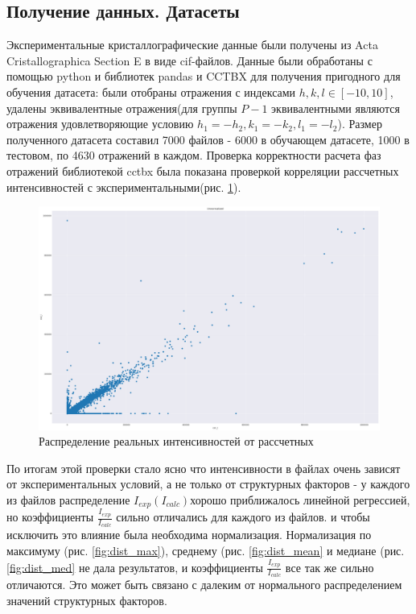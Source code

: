 \documentclass{article}
\begin{document}
\subsection{Получение данных. Датасеты}
Экспериментальные кристаллографические данные были получены из Acta Cristallographica Section E в виде cif-файлов. Данные были обработаны с помощью python и библиотек pandas и CCTBX для получения пригодного для обучения датасета: были отобраны отражения с индексами $h,k,l \in [-10, 10]$, удалены эквивалентные отражения(для группы $P-1$ эквивалентными являются отражения удовлетворяющие условию $h_1=-h_2, k_1=-k_2, l_1=-l_2$). Размер полученного датасета составил 7000 файлов - 6000 в обучающем датасете, 1000 в тестовом, по 4630 отражений в каждом. Проверка корректности расчета фаз отражений библиотекой cctbx была показана проверкой корреляции рассчетных интенсивностей с экспериментальными(рис. \ref{img:dist}). 

\begin{figure}[h!]
\includegraphics[width=\linewidth]{imgs/dist.png}
  \caption{Распределение реальных интенсивностей от рассчетных}\label{img:dist}
\end{figure}


 По итогам этой проверки стало ясно что интенсивности в файлах очень зависят от экспериментальных условий, а не только от структурных факторов - у каждого из файлов распределение $I_{exp}(I_{calc})$хорошо приближалось линейной регрессией, но коэффициенты $\frac{I_{exp}}{I_{calc}}$ сильно отличались для каждого из файлов. и чтобы исключить это влияние была необходима нормализация. Нормализация по максимуму (рис. \ref{fig:dist_max}), среднему (рис. \ref{fig:dist_mean} и медиане (рис. \ref{fig:dist_med} не дала результатов, и коэффициенты $\frac{I_{exp}}{I_{calc}}$ все так же сильно отличаются. Это может быть связано с далеким от нормального распределением значений структурных факторов.
\end{document}
